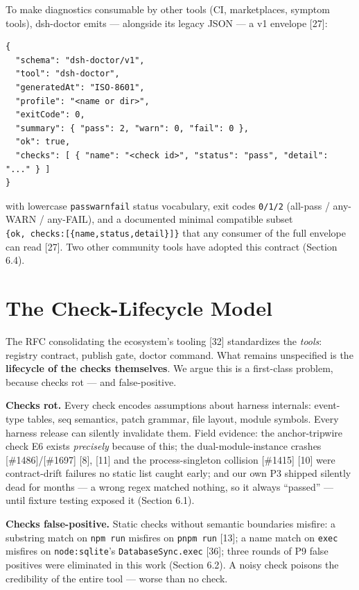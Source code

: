 \documentclass[11pt]{article}
\begin{document}
To make diagnostics consumable by other tools (CI, marketplaces, symptom
tools), dsh-doctor emits --- alongside its legacy JSON --- a v1 envelope
[27]:

\begin{verbatim}
{
  "schema": "dsh-doctor/v1",
  "tool": "dsh-doctor",
  "generatedAt": "ISO-8601",
  "profile": "<name or dir>",
  "exitCode": 0,
  "summary": { "pass": 2, "warn": 0, "fail": 0 },
  "ok": true,
  "checks": [ { "name": "<check id>", "status": "pass", "detail": "..." } ]
}
\end{verbatim}


with lowercase \texttt{pass\textbar{}warn\textbar{}fail} status
vocabulary, exit codes \texttt{0/1/2} (all-pass / any-WARN / any-FAIL),
and a documented minimal compatible subset
\texttt{\{ok,\ checks:[\{name,status,detail\}]\}} that any consumer
of the full envelope can read [27]. Two other community tools have
adopted this contract (Section 6.4).

\section{The Check-Lifecycle
Model}\label{the-check-lifecycle-model}

The RFC consolidating the ecosystem's tooling [32] standardizes the
\emph{tools}: registry contract, publish gate, doctor command. What
remains unspecified is the \textbf{lifecycle of the checks themselves}.
We argue this is a first-class problem, because checks rot --- and
false-positive.

\textbf{Checks rot.} Every check encodes assumptions about harness
internals: event-type tables, seq semantics, patch grammar, file layout,
module symbols. Every harness release can silently invalidate them.
Field evidence: the anchor-tripwire check E6 exists \emph{precisely}
because of this; the dual-module-instance crashes
[\#1486]/[\#1697] [8], [11] and the process-singleton
collision [\#1415] [10] were contract-drift failures no static
list caught early; and our own P3 shipped silently dead for months --- a
wrong regex matched nothing, so it always ``passed'' --- until fixture
testing exposed it (Section 6.1).

\textbf{Checks false-positive.} Static checks without semantic
boundaries misfire: a substring match on \texttt{npm\ run} misfires on
\texttt{pnpm\ run} [13]; a name match on \texttt{exec} misfires on
\texttt{node:sqlite}'s \texttt{DatabaseSync.exec} [36]; three rounds
of P9 false positives were eliminated in this work (Section 6.2). A
noisy check poisons the credibility of the entire tool --- worse than no
check.
\end{document}
